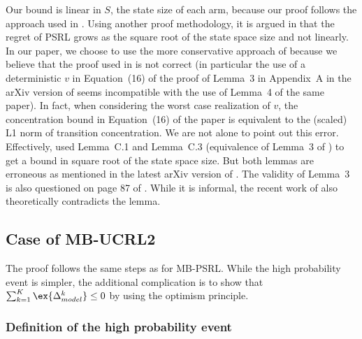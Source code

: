 \begin{subappendices}
Our bound is linear in $S$, the state size of each arm, because our proof follows the approach used in \cite{osband2013more}. Using another proof methodology, it is argued in \cite{osband2017posterior} that the regret of PSRL grows as the square root of the state space size and not linearly. In our paper, we choose to use the more conservative approach of \cite{osband2013more} because we believe that the proof used in \cite{osband2017posterior} is not correct (in particular the use of a deterministic $v$ in Equation~(16) of the proof of Lemma~3 in Appendix~A in the arXiv version of \cite{osband2017posterior} seems incompatible with the use of Lemma~4 of the same paper).
In fact, when considering the worst case realization of $v$, the concentration bound in Equation~(16) of the paper is equivalent to the (scaled) L1 norm of transition concentration.
We are not alone to point out this error. Effectively, \cite{agrawal2017posterior} used Lemma~C.1 and Lemma~C.3 (equivalence of Lemma~3 of \cite{osband2017posterior}) to get a bound in square root of the state space size. But both lemmas are erroneous as mentioned in the latest arXiv version of \cite{agrawal2017posterior}. The validity of Lemma~3 is also questioned on page 87 of \cite{fruit2019exploration}. While it is informal, the recent work of \cite{qian2020concentration} also theoretically contradicts the lemma.

\subsection{Case of MB-UCRL2}
\label{ssec:proof_UCRL2}

The proof follows the same steps as for MB-PSRL. While the high probability event is simpler, the additional complication is to show that $\sum_{k=1}^K\ex{\Delta_{model}^k}\le0$ by using the optimism principle. 

\subsubsection{Definition of the high probability event} 


\end{subappendices}

